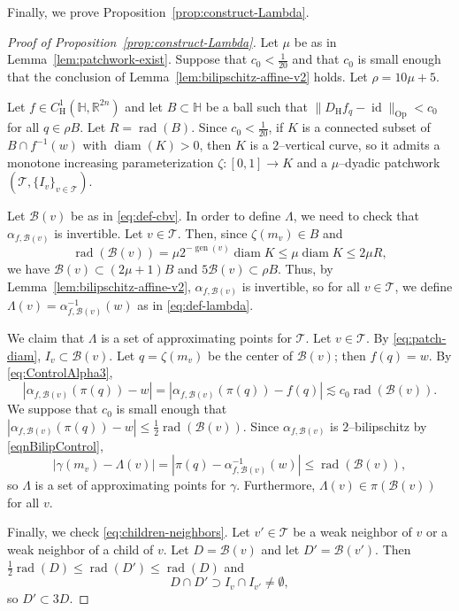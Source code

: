 \documentclass[12pt,reqno]{amsart}
\newcommand{\cB}{\mathcal{B}}
\newcommand{\cT}{\mathcal{T}}
\newcommand{\DfH}{D_\mathrm{H}f}
\DeclareMathOperator{\rad}{rad}
\DeclareMathOperator{\gen}{gen}
\newcommand{\HH}{\mathbb{H}}
\newcommand{\R}{\mathbb{R}}
\newcommand{\from}{\colon}
\theoremstyle{remark}
\newcommand{\0}{\mathbf{0}}
\renewcommand{\1}{\mathbf 1}
\DeclareMathOperator{\diam}{diam}
\DeclareMathOperator{\id}{id}
\begin{document}
Finally, we prove Proposition~\ref{prop:construct-Lambda}.
\begin{proof}[Proof of Proposition~\ref{prop:construct-Lambda}]
  Let $\mu$ be as in Lemma~\ref{lem:patchwork-exist}. Suppose that $c_0 < \frac{1}{20}$ and that $c_0$ is small enough that the conclusion of Lemma~\ref{lem:bilipschitz-affine-v2} holds. Let $\rho = 10\mu + 5$. 

  Let $f\in C^1_{\mathrm{H}}(\HH, \R^{2n})$ and let $B\subset \HH$ be a ball such that $\|\DfH_q - \id\|_{\mathrm{Op}} < c_0$ for all $q\in \rho B$. Let $R=\rad(B)$. Since $c_0 < \frac{1}{20}$, if $K$ is a connected subset of $B\cap f^{-1}(w)$ with $\diam(K)>0$, then $K$ is a $2$--vertical curve, so it admits a monotone increasing parameterization $\zeta\from [0,1]\to K$ and a $\mu$--dyadic patchwork $(\cT, \{I_v\}_{v\in \cT})$. 

  Let $\cB(v)$ be as in \eqref{eq:def-cbv}.
  In order to define $\Lambda$, we need to check that $\alpha_{f,\cB(v)}$ is invertible. Let $v\in \cT$. Then, since $\zeta(m_v)\in B$ and
  $$\rad(\cB(v)) = \mu 2^{-\gen(v)}\diam K \le \mu \diam K \le 2\mu R,$$
  we have $\cB(v) \subset (2\mu + 1) B$ and $5\cB(v) \subset \rho B$. Thus, by Lemma~\ref{lem:bilipschitz-affine-v2}, $\alpha_{f,\cB(v)}$ is invertible, so for all $v\in \cT$, we define $\Lambda(v) = \alpha_{f,\cB(v)}^{-1}(w)$ as in \eqref{eq:def-lambda}.

  We claim that $\Lambda$ is a set of approximating points for $\cT$. Let $v\in \cT$. By \eqref{eq:patch-diam}, $I_v \subset \cB(v)$. Let $q = \zeta(m_v)$ be the center of $\cB(v)$; then $f(q)=w$.  By \eqref{eq:ControlAlpha3},
  $$|\alpha_{f,\cB(v)}(\pi(q)) - w| = |\alpha_{f,\cB(v)}(\pi(q)) - f(q)| \lesssim c_0 \rad(\cB(v)).$$
  We suppose that $c_0$ is small enough that $|\alpha_{f,\cB(v)}(\pi(q)) - w| \le \frac{1}{2}\rad(\cB(v))$.
  Since $\alpha_{f,\cB(v)}$ is $2$--bilipschitz by \eqref{eqnBilipControl}, 
  \begin{equation}\label{eqn:ApproximatingRad}
  |\gamma(m_v) - \Lambda(v)| = |\pi(q) - \alpha_{f,\cB(v)}^{-1}(w)| \le \rad(\cB(v)),
  \end{equation}
  so $\Lambda$ is a set of approximating points for $\gamma$. Furthermore, $\Lambda(v) \in \pi\left(\cB(v)\right)$ for all $v$.

  Finally, we check \eqref{eq:children-neighbors}. Let $v'\in \cT$ be a weak neighbor of $v$ or a weak neighbor of a child of $v$. Let $D=\cB(v)$ and let $D'=\cB(v')$. Then $\frac{1}{2}\rad(D) \le \rad(D')\le \rad(D)$ and 
  $$D \cap D' \supset I_v\cap I_{v'}\ne \emptyset,$$
  so $D' \subset 3D$. 


\end{proof}
\end{document}
